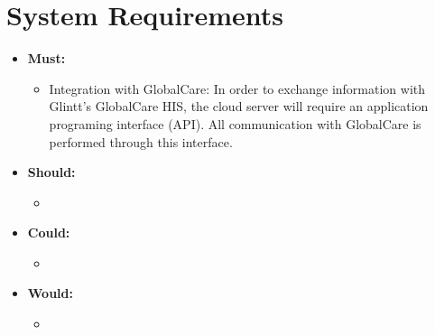 
\section{System Requirements}

\begin{itemize}
    \item \textbf{Must:}
    \begin{itemize}
        \item Integration with GlobalCare: In order to exchange information with Glintt's GlobalCare HIS, the cloud server will require an application programing interface (API). All communication with GlobalCare is performed through this interface. 
    \end{itemize}
    \item \textbf{Should:}
    \begin{itemize}
        \item 
    \end{itemize}
    \item \textbf{Could:}
    \begin{itemize}
        \item 
    \end{itemize}
    \item \textbf{Would:}
    \begin{itemize}
        \item 
    \end{itemize}
\end{itemize}

